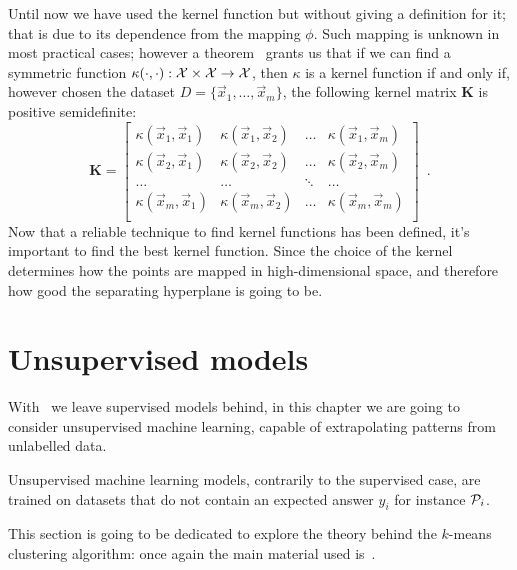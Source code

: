 Until now we have used the kernel function but without giving a definition for it; that is due to its
dependence from the mapping $\phi$. Such mapping is unknown in most practical cases; however a
theorem~\cite{learning-with-kernels} grants us that if we can find a symmetric function
$\kappa(\cdot, \cdot): \mathcal{X} \times \mathcal{X} \rightarrow \mathcal{X}$, then $\kappa$ is a kernel function if and
only if, however chosen the dataset $D = \{\vec{x}_1, \allowbreak\ldots\allowbreak, \vec{x}_m\}$,
the following kernel matrix $\mathbf{K}$ is positive semidefinite:
\begin{equation}
	\label{eq:kernel-matrix}
	\mathbf{K} =
	\begin{bmatrix}
		\kappa(\vec{x}_1, \vec{x}_1) & \kappa(\vec{x}_1, \vec{x}_2) & \ldots &
		\kappa(\vec{x}_1, \vec{x}_m)                                                  \\
		\kappa(\vec{x}_2, \vec{x}_1) & \kappa(\vec{x}_2, \vec{x}_2) & \ldots &
		\kappa(\vec{x}_2, \vec{x}_m)                                                  \\
		\ldots                       & \ldots                       & \ddots & \ldots \\
		\kappa(\vec{x}_m, \vec{x}_1) & \kappa(\vec{x}_m, \vec{x}_2) & \ldots &
		\kappa(\vec{x}_m, \vec{x}_m)                                                  \\
	\end{bmatrix} \enspace.
\end{equation}
Now that a reliable technique to find kernel functions has been defined, it's important to find the
best kernel function. Since the choice of the kernel determines how the points are mapped in
high-dimensional space, and therefore how good the separating hyperplane is going to be.

\section{Unsupervised models}
\label{sec:uml}
With \svms\ we leave supervised models behind, in this chapter we are going to consider unsupervised
machine learning, capable of extrapolating patterns from unlabelled data.

Unsupervised machine learning models, contrarily to the supervised case, are trained on datasets
that do not contain an expected answer $y_i$ for instance $\mathcal{P}_i$.

This section is going to be dedicated to explore the theory behind the $k$-means clustering
algorithm: once again the main material used is~\cite{ZhouZhi-Hua2021ML}.

